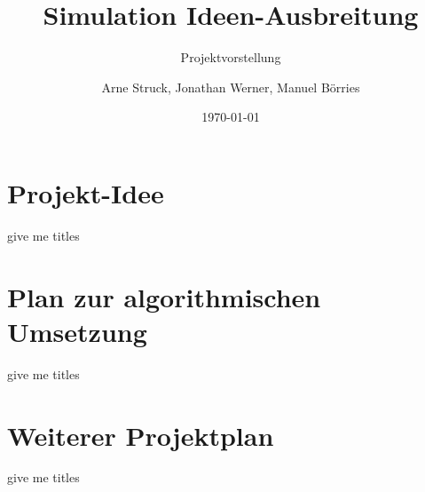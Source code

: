 \documentclass{beamer}
\title{Simulation Ideen-Ausbreitung}
\subtitle{Projektvorstellung}
\author{Arne Struck, Jonathan Werner, Manuel Börries}
\institute{Universität Hamburg, Fachschaft Informatik, Praktikum paralleles Programmieren}
\date{\today}
\begin{document}
\begin{frame}[plain]
	\titlepage
\end{frame}
	
\begin{frame}
	\tableofcontents
\end{frame}

\section{Projekt-Idee}
\begin{frame}{give me titles}
\end{frame}	
	
\section{Plan zur algorithmischen Umsetzung}
\begin{frame}{give me titles}
\end{frame}

\section{Weiterer Projektplan}
\begin{frame}{give me titles}

\end{frame}
	
\end{document}
